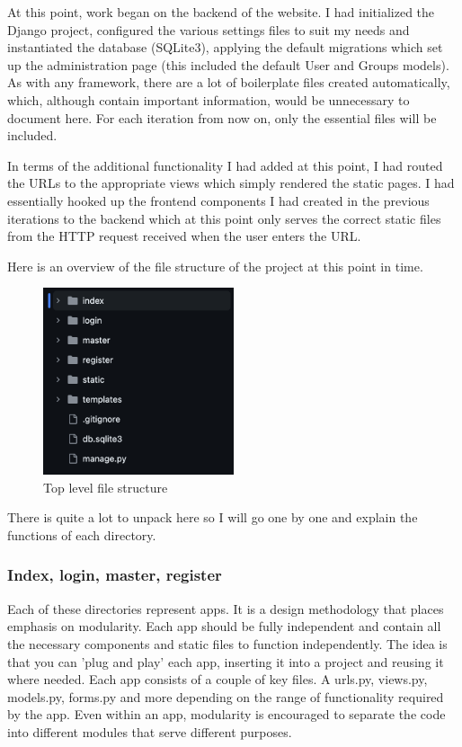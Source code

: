 \documentclass{article}
\begin{document}
At this point, work began on the backend of the website. I had initialized the Django project, configured the various settings files to suit my needs and instantiated the database (SQLite3), applying the default migrations which set up the administration page (this included the default User and Groups models). As with any framework, there are a lot of boilerplate files created automatically, which, although contain important information, would be unnecessary to document here. For each iteration from now on, only the essential files will be included. 

In terms of the additional functionality I had added at this point, I had routed the URLs to the appropriate views which simply rendered the static pages. I had essentially hooked up the frontend components I had created in the previous iterations to the backend which at this point only serves the correct static files from the HTTP request received when the user enters the URL. 

Here is an overview of the file structure of the project at this point in time. 

\begin{figure}[H] 
  \centering
  \includegraphics[width=0.5\textwidth]{img/Figure 16.png}
  \caption{Top level file structure}
\end{figure}

There is quite a lot to unpack here so I will go one by one and explain the functions of each directory. 

\subsubsection{Index, login, master, register}

Each of these directories represent apps. It is a design methodology that places emphasis on modularity. Each app should be fully independent and contain all the necessary components and static files to function independently. The idea is that you can 'plug and play' each app, inserting it into a project and reusing it where needed. Each app consists of a couple of key files. A urls.py, views.py, models.py, forms.py and more depending on the range of functionality required by the app. Even within an app, modularity is encouraged to separate the code into different modules that serve different purposes. 
\end{document}
